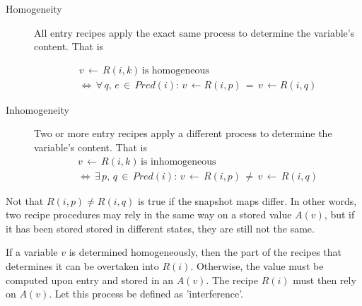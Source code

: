 \documentclass[12pt,a4paper]{scrartcl}
\begin{document}
\begin{description}
    \item[Homogeneity] All entry recipes apply the exact same process to
                       determine the variable's content. That is

    \begin{equation}
        \begin{aligned}
        v\,\leftarrow\,R(i,k)\,\mbox{is homogeneous}\\
        \Leftrightarrow\,\forall\,q,\,e\,\in\,Pred(i):\,v\,\leftarrow R(i,p)\,=\,v\,\leftarrow R(i,q) 
        \end{aligned}
    \end{equation}

    \item[Inhomogeneity] Two or more entry recipes apply a different process
                         to determine the variable's content. That is
    \begin{equation}
        \begin{aligned}
        v\,\leftarrow\,R(i,k)\,\mbox{is inhomogeneous}\\
        \Leftrightarrow\,\exists\,p,\,q\,\in\,Pred(i):\,v\,\leftarrow\,R(i,p)\,\neq\,v\,\leftarrow\,R(i,q)
        \end{aligned}
    \end{equation}
\end{description}

Not that \(R(i,p) \neq R(i,q)\) is true if the snapshot maps differ. In other
words, two recipe procedures may rely in the same way on a stored value $A(v)$,
but if it has been stored stored in different states, they are still not
the same.

If a variable $v$ is determined homogeneously, then the part of the recipes
that determines it can be overtaken into $R(i)$. Otherwise, the value must be
computed upon entry and stored in an $A(v)$. The recipe $R(i)$ must then rely
on $A(v)$. Let this process be defined as 'interference'.
\end{document}
